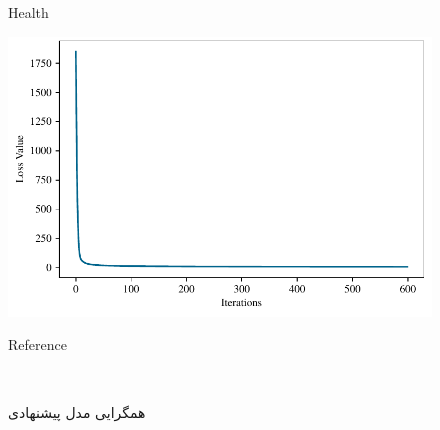 \begin{figure}
\begin{minipage}[b]{0.48\textwidth}
		\caption*{\centering Health}
	\end{minipage}\hfill
	\begin{minipage}[b]{0.48\textwidth}
		\centering
		\includegraphics[width=\textwidth]{figures/Convergence/Convergence(Reference).pdf}
		\caption*{\centering Reference}
	\end{minipage}
	\caption{همگرایی مدل پیشنهادی }‎
	\label{fig:7}
\end{figure}
